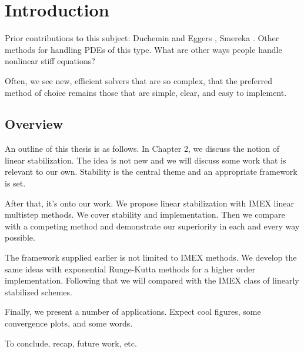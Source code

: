 \chapter{Introduction}
Prior contributions to this subject: Duchemin and Eggers \cite{duchemin2014explicit}, Smereka \cite{smereka2003semi}. Other methods for handling PDEs of this type.
What are other ways people handle nonlinear stiff equations? 

Often, we see new, efficient solvers that are so complex, that the preferred method of choice remains those that are simple, clear, and easy to implement. 

\section{Overview}
An outline of this thesis is as follows. In Chapter 2, we discuss the notion of linear stabilization. The idea is not new and we will discuss some work that is relevant to our own. Stability is the central theme and an appropriate framework is set. 

After that, it's onto our work. We propose linear stabilization with IMEX linear multistep methods. We cover stability and implementation. Then we compare with a competing method and demonstrate our superiority in each and every way possible.

The framework supplied earlier is not limited to IMEX methods. We develop the same ideas with exponential Runge-Kutta methods for a higher order implementation. Following that we will compared with the IMEX class of linearly stabilized schemes.

Finally, we present a number of applications. Expect cool figures, some convergence plots, and some words.

To conclude, recap, future work, etc.